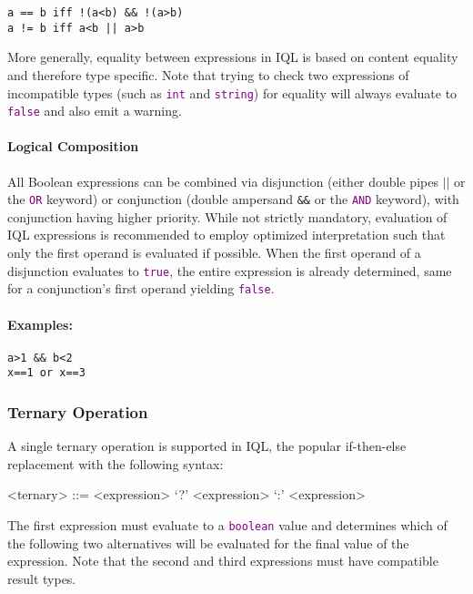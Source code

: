 \documentclass[11pt,a4paper,portrait]{article}
\newcommand{\iql}{IQL\xspace}
\newcommand{\keyword}[1]{\textcolor{purple}{\texttt{#1}}}
\begin{document}
\begin{verbatim}
a == b iff !(a<b) && !(a>b)
a != b iff a<b || a>b
\end{verbatim}

\noindent More generally, equality between expressions in \iql is based on content equality and therefore type specific.
Note that trying to check two expressions of incompatible types (such as \keyword{int} and \keyword{string}) for equality will always evaluate to \keyword{false} and also emit a warning. 

\paragraph{Logical Composition}
\label{sec:logical-composition}

All Boolean expressions can be combined via disjunction (either double pipes \texttt{$||$} or the \keyword{OR} keyword) or conjunction (double ampersand \texttt{\&\&} or the \keyword{AND} keyword), with conjunction having higher priority. While not strictly mandatory, evaluation of \iql expressions is recommended to employ optimized interpretation such that only the first operand is evaluated if possible. When the first operand of a disjunction evaluates to \keyword{true}, the entire expression is already determined, same for a conjunction's first operand yielding \keyword{false}. 

\paragraph{Examples:}

\begin{verbatim}
a>1 && b<2
x==1 or x==3
\end{verbatim}

\subsubsection{Ternary Operation}
\label{sec:ternary-operation}

A single ternary operation is supported in \iql, the popular if-then-else replacement with the following syntax:

\begin{grammar}	
	<ternary> ::= <expression> `?' <expression> `:' <expression>
\end{grammar}

\noindent The first expression must evaluate to a \keyword{boolean} value and determines which of the following two alternatives will be evaluated for the final value of the expression. Note that the second and third expressions must have compatible result types.
\end{document}
